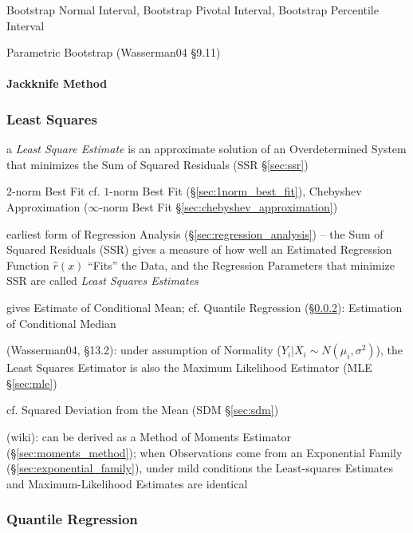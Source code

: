 Bootstrap Normal Interval, Bootstrap Pivotal Interval, Bootstrap Percentile
Interval

Parametric Bootstrap (Wasserman04 \S9.11)



\paragraph{Jackknife Method}\label{sec:jackknife_method}\hfill



\subsubsection{Least Squares}\label{sec:least_squares}

a \emph{Least Square Estimate} is an approximate solution of an Overdetermined
System that minimizes the Sum of Squared Residuals (SSR \S\ref{sec:ssr})

$2$-norm Best Fit \fist cf. $1$-norm Best Fit (\S\ref{sec:1norm_best_fit}),
Chebyshev Approximation ($\infty$-norm Best Fit
\S\ref{sec:chebyshev_approximation})

earliest form of Regression Analysis (\S\ref{sec:regression_analysis})
-- the Sum of Squared Residuals (SSR) gives a measure of how well
an Estimated Regression Function $\hat{r}(x)$ ``Fits'' the Data, and the
Regression Parameters that minimize SSR are called \emph{Least Squares
  Estimates}

gives Estimate of Conditional Mean; cf. Quantile Regression
(\S\ref{sec:quantile_regression}): Estimation of Conditional Median

(Wasserman04, \S13.2):
 under assumption of Normality ($Y_i | X_i \sim N(\mu_i, \sigma^2)$), the Least
 Squares Estimator is also the Maximum Likelihood Estimator (MLE
 \S\ref{sec:mle})

cf. Squared Deviation from the Mean (SDM \S\ref{sec:sdm})

(wiki): can be derived as a Method of Moments Estimator
(\S\ref{sec:moments_method});
when Observations come from an Exponential Family
(\S\ref{sec:exponential_family}), under mild conditions the Least-squares
Estimates and Maximum-Likelihood Estimates are identical



\subsubsection{Quantile Regression}\label{sec:quantile_regression}

